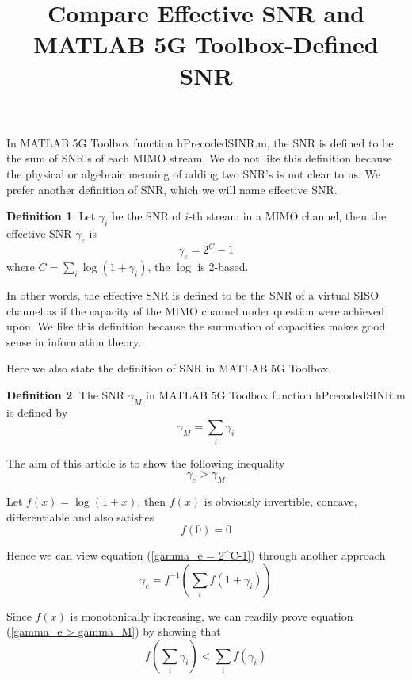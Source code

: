 \documentclass[12pt]{article}
\title{Compare Effective SNR and MATLAB 5G Toolbox-Defined SNR}
\theoremstyle{definition}
\newtheorem{definition}{Definition}
\begin{document}
\maketitle
In MATLAB 5G Toolbox function hPrecodedSINR.m, the SNR  is defined to be the sum of SNR's of each MIMO stream. We do not like this definition because the physical or algebraic meaning of adding two SNR's is not clear to us. We prefer another definition of SNR, which we will name effective SNR.

\begin{definition}
	Let $\gamma_i$ be the SNR of $i$-th stream in a MIMO channel, then the effective SNR $\gamma_e$ is
	\begin{equation}
		\gamma_e = 2^C-1 \label{gamma_e = 2^C-1}
	\end{equation}
	where $C=\sum_i\log(1+\gamma_i)$, the $\log$ is 2-based.
\end{definition}
In other words, the effective SNR is defined to be the SNR of a virtual SISO channel as if the capacity of the MIMO channel under question were achieved upon. We like this definition because the summation of capacities makes good sense in information theory.

Here we also state the definition of SNR in MATLAB 5G Toolbox.
\begin{definition}
	The SNR $\gamma_M$ in MATLAB 5G Toolbox function hPrecodedSINR.m is defined by
	$$\gamma_M = \sum_i\gamma_i$$
\end{definition}

The aim of this article is to show the following inequality
\begin{equation}
	\gamma_e > \gamma_M \label{gamma_e > gamma_M}
\end{equation}

Let $f(x) = \log(1+x)$, then $f(x)$ is obviously invertible, concave, differentiable and also satisfies
$$f(0)=0$$

Hence we can view equation (\ref{gamma_e = 2^C-1}) through another approach
$$\gamma_e = f^{-1}\left(\sum_if(1+\gamma_i)\right)$$

Since $f(x)$ is monotonically increasing, we can readily prove equation (\ref{gamma_e > gamma_M}) by showing that
\begin{equation}
	f\left(\sum_i\gamma_i\right)<\sum_if(\gamma_i) \label{fsum<sumf}
\end{equation}
\end{document}
